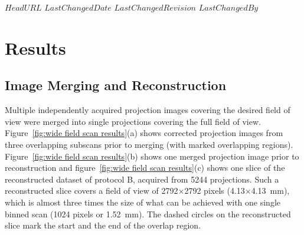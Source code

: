 \svnidlong
{$HeadURL$}
{$LastChangedDate$}
{$LastChangedRevision$}
{$LastChangedBy$}
%
\section{Results}\label{sec:Results}
\subsection{Image Merging and Reconstruction}\label{sec:Image Merging and Reconstruction}
Multiple independently acquired projection images covering the desired field of view were merged into single projections covering the full field of view. Figure~\ref{fig:wide field scan results}(a) shows corrected projection images from three overlapping subscans prior to merging (with marked overlapping regions). Figure~\ref{fig:wide field scan results}(b) shows one merged projection image prior to reconstruction and figure~\ref{fig:wide field scan results}(c) shows one slice of the reconstructed dataset of protocol B, acquired from 5244 projections. Such a reconstructed slice covers a field of view of 2792$\times$2792 pixels (4.13$\times$\SI{4.13}{\milli\meter}), which is almost three times the size of what can be achieved with one single binned scan (1024 pixels or \SI{1.52}{\milli\meter}). %
The dashed circles on the reconstructed slice mark the start and the end of the overlap region.

